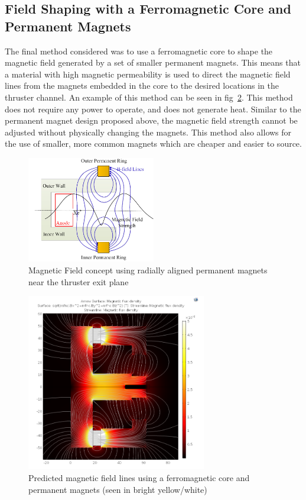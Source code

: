 \subsection{Field Shaping with a Ferromagnetic Core and Permanent Magnets}
The final method considered was to use a ferromagnetic core to shape the magnetic field generated by a set of smaller permanent magnets. This means that a material with high magnetic permeability is used to direct the magnetic field lines from the magnets embedded in the core to the desired locations in the thruster channel. An example of this method can be seen in fig~\ref{fig:ugrad-het-magnetic-shunt}. This method does not require any power to operate, and does not generate heat. Similar to the permanent magnet design proposed above, the magnetic field strength cannot be adjusted without physically changing the magnets. This method also allows for the use of smaller, more common magnets which are cheaper and easier to source.

\begin{figure}[H]
    \centering
    \includegraphics[width=0.5\textwidth]{images/Concepts/radial permanent magnets.png}
    \captionsetup{justification=centering}
    \caption{Magnetic Field concept using radially aligned permanent magnets near the thruster exit plane \cite{Ding_2017}}
    \label{fig:radial-permanent-magnet-concept}
\end{figure}

\begin{figure}[H]
    \centering
    \includegraphics[width=0.7\textwidth]{images/Concepts/UGRAD magnetic shunt.png}
    \captionsetup{justification=centering}
    \caption{Predicted magnetic field lines using a ferromagnetic core and permanent magnets (seen in bright yellow/white) \cite{ugrad-het-olin-college}}
    \label{fig:ugrad-het-magnetic-shunt}
\end{figure}